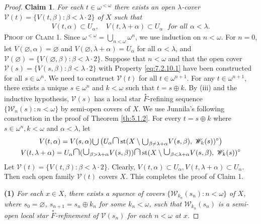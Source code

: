 \documentclass[jisng7iii.tex]{subfiles}
\begin{document}
\begin{proof}
 \textbf{Claim 1}. \textit{For each $t \in \omega^{ < \omega}$ there exists an open $\lambda$-cover 
 $\mathscr{V}(t) =\{V(t, \beta): \beta < \lambda\cdot 2\}$ of  $X$ such that}
 \begin{gather}
 	V(t, \alpha) \subset U_\alpha,\quad V(t, \lambda + \alpha) \subset U_\alpha \;
 	\textit{ for all } \alpha < \lambda. \label{eq:7.2.10.1}
 \end{gather}
\textsc{Proof of Claim 1}. 
 Since $\omega^{ < \omega} = \bigcup_{n <\omega}\omega^n$, we use induction on $n < \omega$. 
 For $n = 0$, let $V(\varnothing, \alpha) = \varnothing$ and  
 $V(\varnothing, \lambda+\alpha) = U_\alpha$ 
 for all $\alpha<\lambda$, and 
 $\mathscr{V}(\varnothing) = \{V(\varnothing, \beta): \beta < \lambda\cdot 2\}$. 
 Suppose that $n < \omega$ and that the open cover 
 $\mathscr{V}(s) =  \{V(s, \beta): \beta < \lambda\cdot 2\}$ with Property \eqref{eq:7.2.10.1}
 have been constructed for all $s \in \omega^n$. 
 We need to construct $\mathscr{V}(t)$ for all $t \in \omega^{n+1}$.
For any $t \in \omega^{n+1}$, there exists a unique $s\in\omega^n$ and $k<\omega$ such that $t=s\oplus k$. 
By (iii) and the inductive hypothesis, $\mathscr{V}(s)$ 
has a local star $\overset{*}{F}$-refining sequence 
$\{\mathscr{W}_n(s): n < \omega\}$ by semi-open covers of  $X$. 
We use Junnila's following construction in the proof of Theorem \ref{th:5.1.2}. 
For every $t = s\oplus k$ where $s\in \omega^n, k < \omega$ and $\alpha < \lambda$, let 
\begin{gather}
V(t, \alpha) = 	V(s, \alpha)\raisebox{-2pt}{\scalebox{1.5}{$\cup$}} \left(U_\alpha\scalebox{1.5}{$\cap$} 
	\operatorname{st}(X\setminus \raisebox{-2pt}{\scalebox{1.5}{$\cup$}}_{\beta\ne \lambda+\alpha}V(s, \beta), \;
	\mathscr{W}_k(s))^\circ\right) \label{eq:7.2.10.2} \\
V(t, \lambda+ \alpha) = U_\alpha \scalebox{1.5}{$\cap$} (\scalebox{1.5}{$\cup$}_{\beta> \lambda+\alpha}V(s, \beta)) \scalebox{1.5}{$\cap$} \operatorname{st}(X\setminus 
  \scalebox{1.5}{$\cup$}_{\beta < \lambda+\alpha}V(s, \beta),\;
  \mathscr{W}_k(s))^\circ \label{eq:7.2.10.3} 
\end{gather}
Let $\mathscr{V}(t) =  \{V(t, \beta): \beta < \lambda\cdot 2\}$. 
 Clearly, 	$V(t, \alpha) \subset U_\alpha, V(t, \lambda + \alpha) \subset U_\alpha$.
Then each open family $\mathscr{V}(t)$ covers  $X$. This completes the proof of Claim 1.

\textbf{(1)} \textit{For each $x\in X$, there exists a squence of  covers 
	$\{\mathscr{W}_{k_n}(s_n): n < \omega\}$ of $X$, where $s_0 = \varnothing$,
	$s_{n+1} = s_n \oplus k_n$ for some $k_n < \omega$,
such that $\mathscr{W}_{k_n}(s_n)$ is a 
semi-open local star $\overset{*}{F}$-refinement of  $\mathscr{V}(s_n)$  for each $n< \omega$ at $x$.
}


\end{proof}
\end{document}
